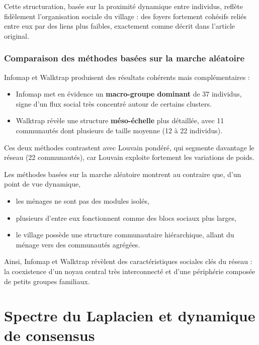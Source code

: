 \documentclass[10pt,twocolumn]{article}
\begin{document}
Cette structuration, basée sur la proximité dynamique entre individus,
reflète fidèlement l’organisation sociale du village :  
des foyers fortement cohésifs reliés entre eux par des liens plus faibles,
exactement comme décrit dans l’article original.

\subsubsection*{Comparaison des méthodes basées sur la marche aléatoire}

Infomap et Walktrap produisent des résultats cohérents mais complémentaires :

\begin{itemize}
    \item Infomap met en évidence un \textbf{macro-groupe dominant} de 37 individus,
          signe d’un flux social très concentré autour de certains clusters.
    \item Walktrap révèle une structure \textbf{méso-échelle} plus détaillée,
          avec 11 communautés dont plusieurs de taille moyenne (12 à 22 individus).
\end{itemize}

Ces deux méthodes contrastent avec Louvain pondéré, qui segmente davantage
le réseau (22 communautés), car Louvain exploite fortement les variations de poids.

Les méthodes basées sur la marche aléatoire montrent au contraire que,
d’un point de vue dynamique,  

\begin{itemize}
    \item les ménages ne sont pas des modules isolés,
    \item plusieurs d’entre eux fonctionnent comme des blocs sociaux plus larges,
    \item le village possède une structure communautaire hiérarchique,
          allant du ménage vers des communautés agrégées.
\end{itemize}

Ainsi, Infomap et Walktrap révèlent des caractéristiques sociales clés du réseau :
la coexistence d’un noyau central très interconnecté et d’une périphérie composée
de petits groupes familiaux.



\section{Spectre du Laplacien et dynamique de consensus}
\end{document}
